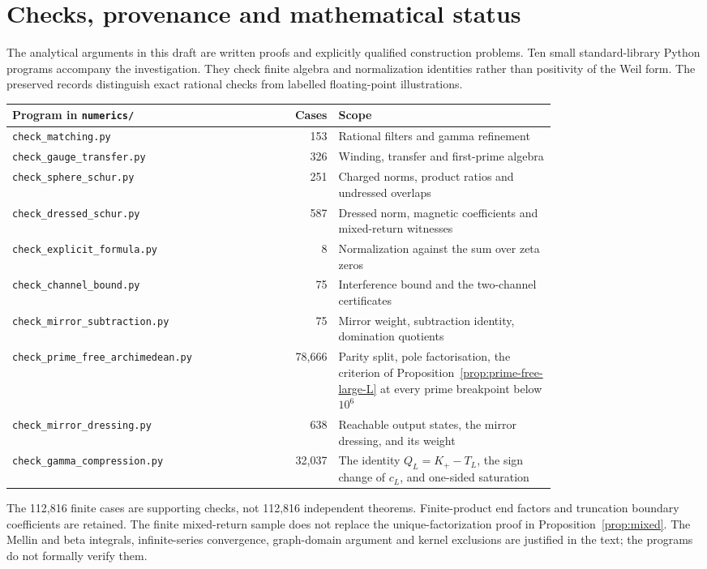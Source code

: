 \section{Checks, provenance and mathematical status}\label{app:checks}
The analytical arguments in this draft are written proofs and explicitly
qualified construction problems. Ten small standard-library Python
programs accompany the investigation. They check finite algebra and
normalization identities rather than positivity of the Weil form.
The preserved records distinguish exact rational checks from labelled
floating-point illustrations.
\begin{center}
\small
\begin{tabular}{p{0.38\linewidth}rp{0.40\linewidth}}
\toprule
Program in \texttt{numerics/} & Cases & Scope \\
\midrule
\texttt{check\_matching.py} & 153 & Rational filters and gamma refinement \\
\texttt{check\_gauge\_transfer.py} & 326 & Winding, transfer and first-prime algebra \\
\texttt{check\_sphere\_schur.py} & 251 & Charged norms, product ratios and undressed overlaps \\
\texttt{check\_dressed\_schur.py} & 587 & Dressed norm, magnetic coefficients and mixed-return witnesses \\
\texttt{check\_explicit\_formula.py} & 8 & Normalization against the sum over zeta zeros \\
\texttt{check\_channel\_bound.py} & 75 & Interference bound and the two-channel certificates \\
\texttt{check\_mirror\_subtraction.py} & 75 & Mirror weight, subtraction identity, domination quotients \\
\texttt{check\_prime\_free\_archimedean.py} & 78,666 & Parity split, pole factorisation, the criterion of Proposition~\ref{prop:prime-free-large-L} at every prime breakpoint below $10^6$ \\
\texttt{check\_mirror\_dressing.py} & 638 & Reachable output states, the mirror dressing, and its weight \\
\texttt{check\_gamma\_compression.py} & 32,037 & The identity $Q_L=K_+-T_L$, the sign change of $c_L$, and one-sided saturation \\
\bottomrule
\end{tabular}
\end{center}
The 112,816 finite cases are supporting checks, not 112,816 independent
theorems. Finite-product end factors and truncation boundary
coefficients are retained. The finite mixed-return sample does not
replace the unique-factorization proof in Proposition~\ref{prop:mixed}.
The Mellin and beta integrals, infinite-series convergence,
graph-domain argument and kernel exclusions are justified in the text;
the programs do not formally verify them.

